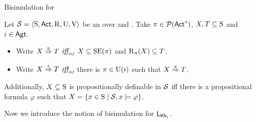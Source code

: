 \documentclass{beamer}
\begin{document}
    


\begin{frame}
    {Bisimulation for \KHilogic}

    \begin{definition}\label{def:notation}
Let $\mathcal{S}=\langle \operatorname{S},{\rm \sf Act},\operatorname{R},\operatorname{U},\operatorname{V} \rangle$ be an \ults over \PROP and \AGT. Take $\pi \in \mathcal P ({\rm \sf Act}^*)$, $X, T \subseteq \operatorname{S}$ and $i \in {\rm \sf Agt}$.
\begin{itemize} \itemsep 0pt
    \item Write $X \stackrel{\pi}{\Rightarrow} T$ $\mbox{\it iff}_{\mbox{\tiny\it def}}$ $X \subseteq \operatorname{SE}(\pi)$ and $\operatorname{R}_{\pi}(X) \subseteq T$.

    \item Write $X \stackrel{i}{\Rightarrow} T$ $\mbox{\it iff}_{\mbox{\tiny\it def}}$ there is $\pi \in \operatorname{U}(i)$ such that $X \stackrel{\pi}{\Rightarrow} T$.
\end{itemize}
Additionally, $X \subseteq \operatorname{S}$ is propositionally definable in $\mathcal{S}$ iff there is a propositional formula $\varphi$ such that $X = \{ x \in \operatorname{S} \mid \mathcal{S}, x \models \varphi\}$.
\end{definition}

\pause
Now we introduce the notion of bisimulation for $\mathsf{L}_{\operatorname{\sf Kh}_i}$. 

\end{frame}

\end{document}
